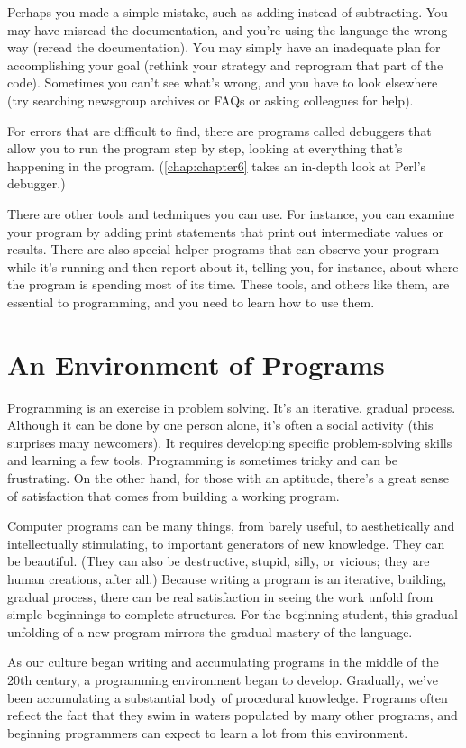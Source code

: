 Perhaps you made a simple mistake, such as adding instead of subtracting. You may have misread the documentation, and you're using the language the wrong way (reread the documentation). You may simply have an inadequate plan for accomplishing your goal (rethink your strategy and reprogram that part of the code). Sometimes you can't see what's wrong, and you have to look elsewhere (try searching newsgroup archives or FAQs or asking colleagues for help).

For errors that are difficult to find, there are programs called debuggers that allow you to run the program step by step, looking at everything that's happening in the program. (\ref{chap:chapter6} takes an in-depth look at Perl's debugger.)

There are other tools and techniques you can use. For instance, you can examine your program by adding print statements that print out intermediate values or results. There are also special helper programs that can observe your program while it's running and then report about it, telling you, for instance, about where the program is spending most of its time. These tools, and others like them, are essential to programming, and you need to learn how to use them. 

\section{An Environment of Programs}
Programming is an exercise in problem solving. It's an iterative, gradual process. Although it can be done by one person alone, it's often a social activity (this surprises many newcomers). It requires developing specific problem-solving skills and learning a few tools.  Programming is sometimes tricky and can be frustrating. On the other hand, for those with an aptitude, there's a great sense of satisfaction that comes from building a working program.

Computer programs can be many things, from barely useful, to aesthetically and intellectually stimulating, to important generators of new knowledge. They can be beautiful. (They can also be destructive, stupid, silly, or vicious; they are human creations, after all.) Because writing a program is an iterative, building, gradual process, there can be real satisfaction in seeing the work unfold from simple beginnings to complete structures. For the beginning student, this gradual unfolding of a new program mirrors the gradual mastery of the language.

As our culture began writing and accumulating programs in the middle of the 20th century, a programming environment began to develop. Gradually, we've been accumulating a substantial body of procedural knowledge.  Programs often reflect the fact that they swim in waters populated by many other programs, and beginning programmers can expect to learn a lot from this environment.

